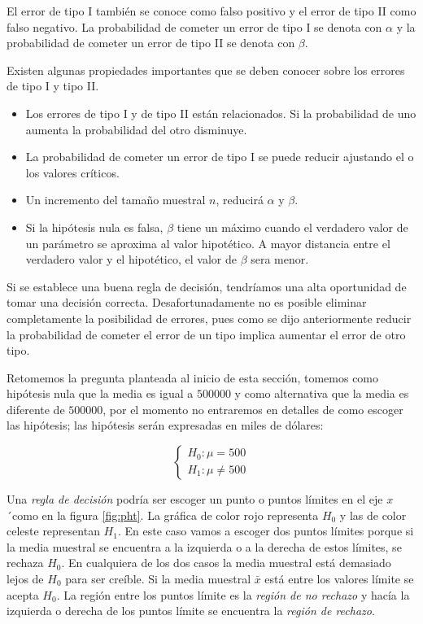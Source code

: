 \documentclass[]{book}
\providecommand{\tightlist}{%
  \setlength{\itemsep}{0pt}\setlength{\parskip}{0pt}}
\begin{document}
El error de tipo I también se conoce como falso positivo y el error de tipo II como falso negativo. La probabilidad de cometer un error de tipo I se denota con \(\alpha\) y la probabilidad de cometer un error de tipo II se denota con \(\beta\).

Existen algunas propiedades importantes que se deben conocer sobre los errores de tipo I y tipo II.

\begin{itemize}
\tightlist
\item
  Los errores de tipo I y de tipo II están relacionados. Si la probabilidad de uno aumenta la probabilidad del otro disminuye.
\item
  La probabilidad de cometer un error de tipo I se puede reducir ajustando el o los valores críticos.
\item
  Un incremento del tamaño muestral \(n\), reducirá \(\alpha\) y \(\beta\).
\item
  Si la hipótesis nula es falsa, \(\beta\) tiene un máximo cuando el verdadero valor de un parámetro se aproxima al valor hipotético. A mayor distancia
  entre el verdadero valor y el hipotético, el valor de \(\beta\) sera menor.
\end{itemize}

Si se establece una buena regla de decisión, tendríamos una alta oportunidad de tomar una decisión correcta. Desafortunadamente no es posible eliminar completamente la posibilidad de errores, pues como se dijo anteriormente reducir la probabilidad de cometer el error de un tipo implica aumentar el error de otro tipo.

Retomemos la pregunta planteada al inicio de esta sección, tomemos como hipótesis nula que la media es igual a \(500000\) y como alternativa que la media es diferente de \(500000\), por el momento no entraremos en detalles de como escoger las hipótesis; las hipótesis serán expresadas en miles de dólares:

\begin{equation} 
\begin{cases} 
H_0: \mu = 500 \\ 
H_1: \mu \neq 500
\end{cases} 
\end{equation}

Una \emph{regla de decisión} podría ser escoger un punto o puntos límites en el eje \(x\)´como en la figura \ref{fig:pht}. La gráfica de color rojo representa \(H_0\) y las de color celeste representan \(H_1\). En este caso vamos a escoger dos puntos límites porque si la media muestral se encuentra a la izquierda o a la derecha de estos límites, se rechaza \(H_0\). En cualquiera de los dos casos la media muestral está demasiado lejos de \(H_0\) para ser creíble. Si la media muestral \(\bar{x}\) está entre los valores límite se acepta \(H_0\). La región entre los puntos límite es la \emph{región de no rechazo} y hacía la izquierda o derecha de los puntos límite se encuentra la \emph{región de rechazo}.
\end{document}
